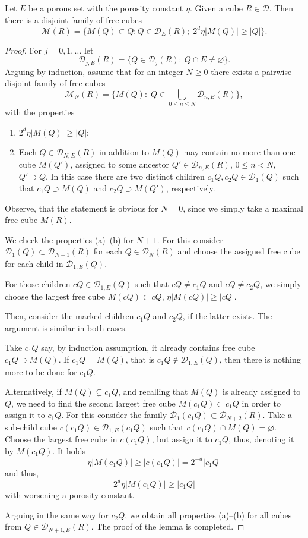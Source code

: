 \documentclass[10pt,a4paper]{amsart}
\begin{document}
 \begin{lemma}\label{lem}
   Let  $E$ be a porous set with the porosity constant $\eta$. Given  a cube $R\in \mathcal{D}$. Then there is a  disjoint family of free cubes
   \[\mathcal{M}(R) = \{M(Q) \subset Q: Q \in \mathcal{D}_E(R);\;  2^d \eta | M(Q)| \geq |Q|\}.\]
    \end{lemma}

   \begin{proof}
    For $j=0,1,\dots$ let
\[\mathcal{D}_{j,E}(R)=\{Q \in \mathcal{D}_j(R): \:  Q \cap E \neq \varnothing\}.\]
Arguing by induction,  assume that for an integer $ N\geq 0$ there exists a pairwise disjoint family of free cubes
    \[ \mathcal{M}_N(R)=\{M(Q): \;  Q \in \bigcup _{0 \leq n \leq N}\mathcal{D}_{n,E}(R)\},\]
     with the properties
      \begin{enumerate}
         \item[(a)] $ 2^d \eta | M(Q)| \geq |Q|$;
          \item [(b)] Each $Q \in \mathcal{D}_{N,E}(R)$  in addition to    $M(Q)$ may contain no more than one cube $M(Q')$, assigned to  some ancestor $Q' \in \mathcal{D}_{n,E}(R)$, $ 0 \leq n <N$, $Q' \supset Q$.  In this  case there are two distinct children $c_1Q, c_2Q \in  \mathcal{D}_1 (Q)$  such that $c_1Q\supset M(Q)$ and    $c_2Q\supset M(Q')$, respectively.
  \end{enumerate}
 Observe, that the statement is obvious for $N=0$, since we simply take a maximal free cube $M(R)$.

   We check the properties (a)--(b) for $N+1$. For this consider   $\mathcal{D}_1 (Q) \subset\mathcal{D}_{N+1}(R)$ for each $Q \in \mathcal{D}_N(R)$ and choose the assigned free cube for each child in $ \mathcal{D}_{1,E} (Q)$.

   For those children $cQ \in \mathcal{D}_{1,E} (Q)$ such that  $cQ \neq c_1Q$ and  $cQ \neq c_2Q$, we simply choose the largest  free cube $M(cQ) \subset cQ$, $\eta |M(cQ)| \geq  |c Q|$.

   Then, consider the marked children  $c_1Q $ and $c_2Q$, if the latter exists.
    The argument is similar in  both cases.

 Take $c_1Q$ say,  by induction assumption, it already contains free cube
    $c_1Q \supset  M(Q)$.   If    $c_1Q=M(Q)$, that is $c_1Q \notin \mathcal{D}_{1,E} (Q)$, then there is nothing more to be done for $c_1Q$.

  Alternatively,
  if $M(Q) \varsubsetneq c_1Q$,  and recalling that  $M(Q)$ is already assigned to $Q$, we need to find the second  largest free cube $M(c_1Q) \subset c_1Q$  in order to assign it to $c_1Q$.
                     For this  consider  the family $\mathcal{D}_1(c_1Q) \subset \mathcal{D}_{N+2}(R)$. Take a sub-child cube  $ c(c_1Q) \in  \mathcal{D}_{1,E}(c_1Q)$ such that   $c(c_1Q) \cap M(Q) = \varnothing$.
  Choose the largest free cube in  $c(c_1Q)$, but assign it to $c_1Q$,  thus,  denoting it  by $M(c_1Q)$. It holds
     \[\eta |M(c_1Q)| \geq |c(c_1Q)|= 2^{-d}  |c_1Q|\]
    and thus,
     \[2^d \eta |M(c_1Q)| \geq    |c_1Q|\]
     with
 worsening a porosity constant.





     Arguing in the same way for $c_2Q$, we obtain
   all properties (a)--(b) for all cubes from $Q \in \mathcal{D}_{N+1,E}(R)$.
The proof of the lemma is completed.
   \end{proof}
\end{document}
